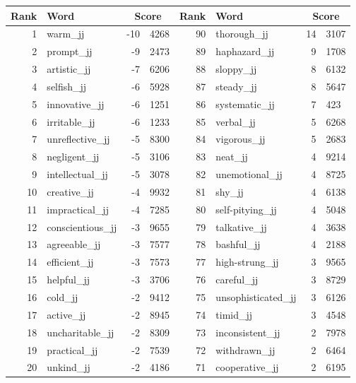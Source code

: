 \begin{table}[tbp]
    \begin{tabular}{| rlr@{.}l | rlr@{.}l |}
    \hline
    \textbf{Rank} & \textbf{Word} & \multicolumn{2}{c|}{\textbf{Score}} & \textbf{Rank} & \textbf{Word} & \multicolumn{2}{c|}{\textbf{Score}} \\
    \hline
    1 & warm\_jj & -10 & 4268    &    90 & thorough\_jj & 14 & 3107 \\
    2 & prompt\_jj & -9 & 2473    &    89 & haphazard\_jj & 9 & 1708 \\
    3 & artistic\_jj & -7 & 6206    &    88 & sloppy\_jj & 8 & 6132 \\
    4 & selfish\_jj & -6 & 5928    &    87 & steady\_jj & 8 & 5647 \\
    5 & innovative\_jj & -6 & 1251    &    86 & systematic\_jj & 7 & 423 \\
    6 & irritable\_jj & -6 & 1233    &    85 & verbal\_jj & 5 & 6268 \\
    7 & unreflective\_jj & -5 & 8300    &    84 & vigorous\_jj & 5 & 2683 \\
    8 & negligent\_jj & -5 & 3106    &    83 & neat\_jj & 4 & 9214 \\
    9 & intellectual\_jj & -5 & 3078    &    82 & unemotional\_jj & 4 & 8725 \\
    10 & creative\_jj & -4 & 9932    &    81 & shy\_jj & 4 & 6138 \\
    11 & impractical\_jj & -4 & 7285    &    80 & self-pitying\_jj & 4 & 5048 \\
    12 & conscientious\_jj & -3 & 9655    &    79 & talkative\_jj & 4 & 3638 \\
    13 & agreeable\_jj & -3 & 7577    &    78 & bashful\_jj & 4 & 2188 \\
    14 & efficient\_jj & -3 & 7573    &    77 & high-strung\_jj & 3 & 9565 \\
    15 & helpful\_jj & -3 & 3706    &    76 & careful\_jj & 3 & 8729 \\
    16 & cold\_jj & -2 & 9412    &    75 & unsophisticated\_jj & 3 & 6126 \\
    17 & active\_jj & -2 & 8945    &    74 & timid\_jj & 3 & 4548 \\
    18 & uncharitable\_jj & -2 & 8309    &    73 & inconsistent\_jj & 2 & 7978 \\
    19 & practical\_jj & -2 & 7539    &    72 & withdrawn\_jj & 2 & 6464 \\
    20 & unkind\_jj & -2 & 4186    &    71 & cooperative\_jj & 2 & 6195 \\

\end{tabular}
\end{table}
